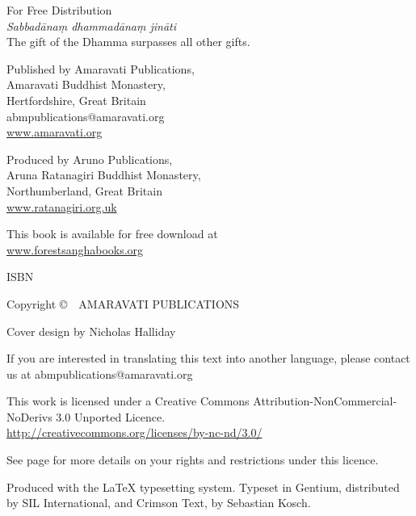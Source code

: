 
\thispagestyle{empty}

{\small\setlength{\parskip}{0.8em}\setlength{\parindent}{0em}%
{\raggedright%

\thetitle

For Free Distribution\\
\emph{Sabbadānaṃ dhammadānaṃ jināti}\\
The gift of the Dhamma surpasses all other gifts.

Published by Amaravati Publications,\\
Amaravati Buddhist Monastery,\\
Hertfordshire, Great Britain\\
abmpublications@amaravati.org\\
\href{http://amaravati.org}{www.amaravati.org}

Produced by Aruno Publications,\\
Aruna Ratanagiri Buddhist Monastery,\\
Northumberland, Great Britain\\
\href{http://ratanagiri.org.uk/}{www.ratanagiri.org.uk}

This book is available for free download at\\
\href{http://forestsanghabooks.org/}{www.forestsanghabooks.org}

ISBN \theISBN

Copyright \copyright\ \the\year\ AMARAVATI PUBLICATIONS

Cover design by Nicholas Halliday

\vfill

{\footnotesize
If you are interested in translating this text into another language, please contact us at abmpublications@amaravati.org

This work is licensed under a Creative Commons Attribution-NonCommercial-NoDerivs 3.0 Unported Licence.\\
\href{http://creativecommons.org/licenses/by-nc-nd/3.0/}{http://creativecommons.org/licenses/by-nc-nd/3.0/}

See page \pageref{copyright-details} for more details on your rights and restrictions under this licence.

Produced with the {\selectfont\LaTeX} typesetting system. Typeset in Gentium, distributed by SIL International, and Crimson Text, by Sebastian Kosch.

\theEditionInfo

}

}}

